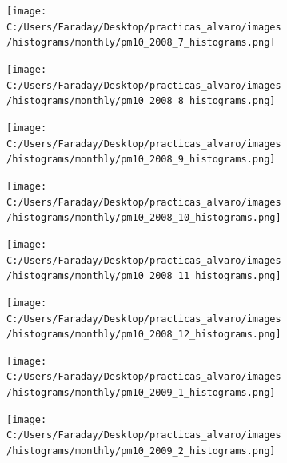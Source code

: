 \documentclass[12pt]{article}
\begin{document}
\newpage

\begin{figure}[H]
\centering
\begin{subfigure}[h]{0.45\textwidth}
\texttt{[image: C:/Users/Faraday/Desktop/practicas\_alvaro/images/histograms/monthly/pm10\_2008\_7\_histograms.png]}
\caption{}
\label{fig:hist-mon-3-7-2008}
\end{subfigure}
%
\begin{subfigure}[H]{0.45\textwidth}
\texttt{[image: C:/Users/Faraday/Desktop/practicas\_alvaro/images/histograms/monthly/pm10\_2008\_8\_histograms.png]}
\caption{}
\label{fig:hist-mon-3-8-2008}
\end{subfigure}
\caption{}
\end{figure}

\begin{figure}[H]
\centering
\begin{subfigure}[h]{0.45\textwidth}
\texttt{[image: C:/Users/Faraday/Desktop/practicas\_alvaro/images/histograms/monthly/pm10\_2008\_9\_histograms.png]}
\caption{}
\label{fig:hist-mon-3-9-2008}
\end{subfigure}
%
\begin{subfigure}[H]{0.45\textwidth}
\texttt{[image: C:/Users/Faraday/Desktop/practicas\_alvaro/images/histograms/monthly/pm10\_2008\_10\_histograms.png]}
\caption{}
\label{fig:hist-mon-3-10-2008}
\end{subfigure}
\caption{}
\end{figure}

\begin{figure}[H]
\centering
\begin{subfigure}[h]{0.45\textwidth}
\texttt{[image: C:/Users/Faraday/Desktop/practicas\_alvaro/images/histograms/monthly/pm10\_2008\_11\_histograms.png]}
\caption{}
\label{fig:hist-mon-3-11-2008}
\end{subfigure}
%
\begin{subfigure}[H]{0.45\textwidth}
\texttt{[image: C:/Users/Faraday/Desktop/practicas\_alvaro/images/histograms/monthly/pm10\_2008\_12\_histograms.png]}
\caption{}
\label{fig:hist-mon-3-12-2008}
\end{subfigure}
\caption{}
\end{figure}

\newpage

\begin{figure}[H]
\centering
\begin{subfigure}[h]{0.45\textwidth}
\texttt{[image: C:/Users/Faraday/Desktop/practicas\_alvaro/images/histograms/monthly/pm10\_2009\_1\_histograms.png]}
\caption{}
\label{fig:hist-mon-3-1-2009}
\end{subfigure}
%
\begin{subfigure}[H]{0.45\textwidth}
\texttt{[image: C:/Users/Faraday/Desktop/practicas\_alvaro/images/histograms/monthly/pm10\_2009\_2\_histograms.png]}
\caption{}
\label{fig:hist-mon-3-2-2009}
\end{subfigure}
\caption{}
\end{figure}
\end{document}
